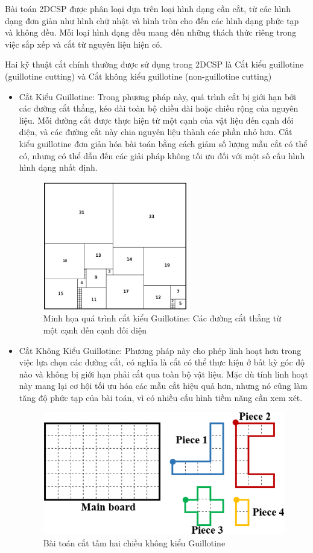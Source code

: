 Bài toán 2DCSP được phân loại dựa trên loại hình dạng cần cắt, từ các hình dạng đơn giản như hình chữ nhật và hình tròn cho đến các hình dạng phức tạp và không đều. Mỗi loại hình dạng đều mang đến những thách thức riêng trong việc sắp xếp và cắt từ nguyên liệu hiện có.

Hai kỹ thuật cắt chính thường được sử dụng trong 2DCSP là Cắt kiểu guillotine (guillotine cutting) và Cắt không kiểu guillotine (non-guillotine cutting)

\begin{itemize}
    \item Cắt Kiểu Guillotine: Trong phương pháp này, quá trình cắt bị giới hạn bởi các đường cắt thẳng, kéo dài toàn bộ chiều dài hoặc chiều rộng của nguyên liệu. Mỗi đường cắt được thực hiện từ một cạnh của vật liệu đến cạnh đối diện, và các đường cắt này chia nguyên liệu thành các phần nhỏ hơn. Cắt kiểu guillotine đơn giản hóa bài toán bằng cách giảm số lượng mẫu cắt có thể có, nhưng có thể dẫn đến các giải pháp không tối ưu đối với một số cấu hình hình dạng nhất định.
    \begin{figure}[!htp]
        \centering
        \includegraphics[width=0.25\linewidth]{Images/2dcspgui.png}
        \caption{Minh họa quá trình cắt kiểu Guillotine: Các đường cắt thẳng từ một cạnh đến cạnh đối diện}
        \label{fig:2dcspgui}
    \end{figure}

    \item Cắt Không Kiểu Guillotine: Phương pháp này cho phép linh hoạt hơn trong việc lựa chọn các đường cắt, có nghĩa là cắt có thể thực hiện ở bất kỳ góc độ nào và không bị giới hạn phải cắt qua toàn bộ vật liệu. Mặc dù tính linh hoạt này mang lại cơ hội tối ưu hóa các mẫu cắt hiệu quả hơn, nhưng nó cũng làm tăng độ phức tạp của bài toán, vì có nhiều cấu hình tiềm năng cần xem xét.

    \begin{figure}[!htp]
        \centering
        \includegraphics[width=0.5\linewidth]{Images/nongui2dcsp.png}
        \caption{Bài toán cắt tấm hai chiều không kiểu Guillotine}
        \label{fig:enter-label}
    \end{figure}
    
\end{itemize}

